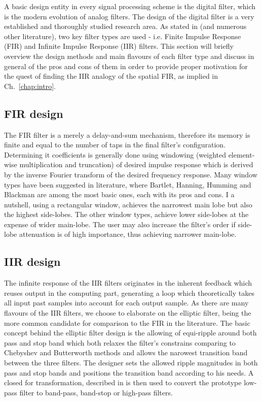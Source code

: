 A basic design entity in every signal processing scheme is the digital filter, which is the modern evolution of analog filters.
The design of the digital filter is a very established and thoroughly studied research area.
As stated in \cite{oppenheim1975digital} (and numerous other literature), two key filter types are used - i.e. Finite Impulse Response (FIR) and Infinite Impulse Response (IIR) filters.
This section will briefly overview the design methods and main flavours of each filter type and discuss in general of the pros and cons of them in order to provide proper motivation for the quest of finding the IIR analogy of the spatial FIR, as implied in Ch.~\ref{chap:intro}.
\subsection{FIR design}
The FIR filter is a merely a delay-and-sum mechanism, therefore its memory is finite and equal to the number of taps in the final filter's configuration.
Determining it coefficients is generally done using windowing (weighted element-wise multiplication and truncation) of desired impulse response which is derived by the inverse Fourier transform of the desired frequency response.
Many window types have been suggested in literature, where Bartlet, Hanning, Humming and Blackman are among the most basic ones, each with its pros and cons.
I a nutshell, using a rectangular window, achieves the narrowest main lobe but also the highest side-lobes.
The other window types, achieve lower side-lobes at the expense of wider main-lobe.
The user may also increase the filter's order if side-lobe attenuation is of high importance, thus achieving narrower main-lobe. 
\subsection{IIR design}
The infinite response of the IIR filters originates in the inherent feedback which reuses output in the computing part, generating a loop which theoretically takes all input past samples into account for each output sample.
As there are many flavours of the IIR filters, we choose to elaborate on the elliptic filter, being the more common candidate for comparison to the FIR in the literature.
The basic concept behind the elliptic filter design is the allowing of equi-ripple around both pass and stop band which both relaxes the filter's constrains comparing to Chebyshev and Butterworth methods and allows the narowest transition band between the three filters.
The designer sets the allowed ripple magnitudes in both pass and stop bands and positions the transition band according to his needs.
A closed for transformation, described in \cite{oppenheim1975digital} is then used to convert the prototype low-pass filter to band-pass, band-stop or high-pass filters.
